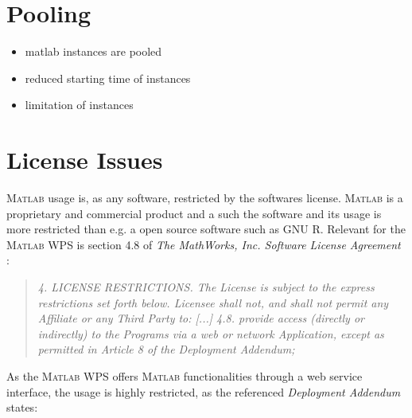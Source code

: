 	\section{Pooling}
	\begin{itemize}
		\item matlab instances are pooled
		\item reduced starting time of instances
		\item limitation of instances
	\end{itemize}
	\section{License Issues}
		\textsc{Matlab} usage is, as any software, restricted by the softwares license. \textsc{Matlab} is a proprietary and commercial product and a such the software and its usage is more restricted than e.g. a open source software such as GNU R. Relevant for the \textsc{Matlab} WPS is section 4.8 of \emph{The MathWorks, Inc. Software License Agreement} \citep{matlablicense}:
		\begin{quote}\itshape\small
			4. LICENSE RESTRICTIONS.  The License is subject to the express restrictions
			set forth below. Licensee shall not, and shall not permit any Affiliate or any
			Third Party to:
				[...]
				4.8. provide access (directly or indirectly) to the Programs via a web or
				network Application, except as permitted in Article 8 of the Deployment
				Addendum;
		\end{quote}

		As the \textsc{Matlab} WPS offers \textsc{Matlab} functionalities through a web service interface, the usage is highly restricted, as the referenced \emph{Deployment Addendum} \citep{matlablicense} states:

